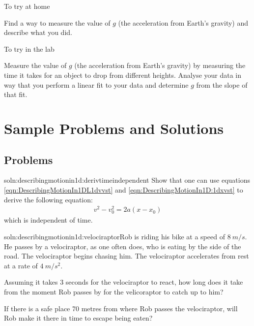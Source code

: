 \begin{chapteractivity}{To try at home}
{
\item Find a way to measure the value of $g$ (the acceleration from Earth's gravity) and describe what you did.
}
\end{chapteractivity}

\begin{chapteractivity}{To try in the lab}
{
\item Measure the value of $g$ (the acceleration from Earth's gravity) by measuring the time it takes for an object to drop from different heights. Analyse your data in way that you perform a linear fit to your data and determine $g$ from the slope of that fit.
}
\end{chapteractivity}
\newpage
\section{Sample Problems and Solutions}
\subsection{Problems}
\begin{problem}{soln:describingmotionin1d:derivtimeindependent}{
\label{prob:describingmotionin1d:derivtimeindependent} Show that one can use equations \ref{eqn:DescribingMotionIn1DL1dvvst} and \ref{eqn:DescribingMotionIn1D:1dxvst} to derive the following equation:
\begin{align*}
v^2-v_0^2=2a(x-x_0)
\end{align*}
which is independent of time.}
\end{problem}

\begin{problemParts}{soln:describingmotionin1d:velociraptor}{\label{prob:describingmotionin1d:velociraptor}Rob is riding his bike at a speed of $\SI{8}{m/s}$. He passes by a velociraptor, as one often does, who is eating by the side of the road. The velociraptor begins chasing him. The velociraptor accelerates from rest at a rate of $\SI{4}{m/s^2}$.} 
\item Assuming it takes 3 seconds for the velociraptor to react, how long does it take from the moment Rob passes by for the velicoraptor to catch up to him? 
\item If there is a safe place 70 metres from where Rob passes the velociraptor, will Rob make it there in time to escape being eaten?  
\end{problemParts}


